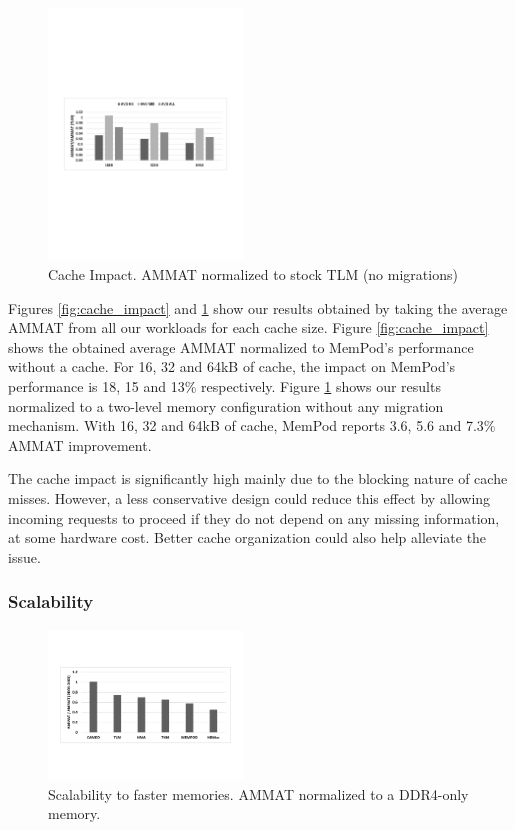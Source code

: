 \begin{figure}
  \includegraphics[width=0.46\textwidth]{figures/revised/old/cache_norm_tlm.pdf}
  \caption{Cache Impact. AMMAT normalized to stock TLM (no migrations)}
  \label{fig:cache_norm_tlm}
\end{figure}

Figures \ref{fig:cache_impact} and \ref{fig:cache_norm_tlm} show our results obtained by taking the average AMMAT from all our workloads for each cache size. Figure \ref{fig:cache_impact} shows the obtained average AMMAT normalized to MemPod's performance without a cache. For 16, 32 and 64kB of cache, the impact on MemPod's performance is 18, 15 and 13\% respectively. Figure \ref{fig:cache_norm_tlm} shows our results normalized to a two-level memory configuration without any migration mechanism. With 16, 32 and 64kB of cache, MemPod reports 3.6, 5.6 and 7.3\% AMMAT improvement.

The cache impact is significantly high mainly due to the blocking nature of cache misses. However, a less conservative design could reduce this effect by allowing incoming requests to proceed if they do not depend on any missing information, at some hardware cost. Better cache organization could also help alleviate the issue.

\subsubsection{Scalability}

\begin{figure}
  \includegraphics[width=0.46\textwidth]{figures/revised/old/scalability_speed.pdf}
  \caption{Scalability to faster memories. AMMAT normalized to a DDR4-only memory.}
  \label{fig:scalability}
\end{figure}

